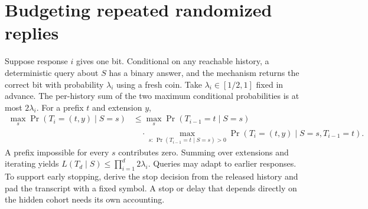 \documentclass[11pt]{article}
\begin{document}
\section{Budgeting repeated randomized replies}
Suppose response $i$ gives one bit. Conditional on any reachable
history, a deterministic query about $S$ has a binary answer, and
the mechanism returns the correct bit with probability $\lambda_i$
using a fresh coin. Take $\lambda_i\in[1/2,1]$ fixed in advance.
The per-history sum of the two maximum conditional probabilities is
at most $2\lambda_i$. For a prefix $t$ and extension $y$,
\[
\begin{aligned}
\max_s\Pr(T_i=(t,y)\mid S=s)
&\le \max_s\Pr(T_{i-1}=t\mid S=s)\\
&\quad{}\cdot
\max_{s:\,\Pr(T_{i-1}=t\mid S=s)>0}
\Pr(T_i=(t,y)\mid S=s,T_{i-1}=t).
\end{aligned}
\]
A prefix impossible for every $s$ contributes zero. Summing over
extensions and iterating yields
$L(T_d\mid S)\le\prod_{i=1}^d2\lambda_i$.
Queries may adapt to earlier responses. To support early stopping,
derive the stop decision from the released history and pad the
transcript with a fixed symbol. A stop or delay that depends directly
on the hidden cohort needs its own accounting.
\end{document}
